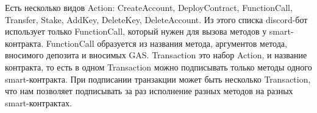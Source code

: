 \begin{definition}
    Есть несколько видов Action: CreateAccount, DeployContract, FunctionCall, Transfer, Stake, AddKey, DeleteKey, DeleteAccount. Из этого списка discord-бот использует только FunctionCall, который нужен для вызова методов у smart-контракта. FunctionCall образуется из названия метода, аргументов метода, вносимого депозита и вносимых GAS. Transaction это набор Action, и название контракта, то есть в одном Transaction можно подписывать только методы одного smart-контракта. При подписании транзакции может быть несколько Transaction, что нам позволяет подписывать за раз исполнение разных методов на разных smart-контрактах.
\end{definition}

\begin{figure}
    \centering
    \caption{}
\end{figure}

